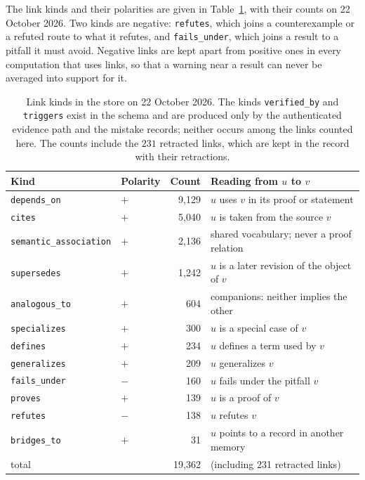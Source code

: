 The link kinds and their polarities are given in Table~\ref{tab:kinds}, with their counts on 22 October 2026. Two kinds are negative: \texttt{refutes}, which joins a counterexample or a refuted route to what it refutes, and \texttt{fails\_under}, which joins a result to a pitfall it must avoid. Negative links are kept apart from positive ones in every computation that uses links, so that a warning near a result can never be averaged into support for it.

\begin{table}[ht]
\centering\small
\begin{tabular}{llrl}
\toprule
Kind & Polarity & Count & Reading from $u$ to $v$ \\
\midrule
\texttt{depends\_on} & $+$ & 9{,}129 & $u$ uses $v$ in its proof or statement \\
\texttt{cites} & $+$ & 5{,}040 & $u$ is taken from the source $v$ \\
\texttt{semantic\_association} & $+$ & 2{,}136 & shared vocabulary; never a proof relation \\
\texttt{supersedes} & $+$ & 1{,}242 & $u$ is a later revision of the object of $v$ \\
\texttt{analogous\_to} & $+$ & 604 & companions: neither implies the other \\
\texttt{specializes} & $+$ & 300 & $u$ is a special case of $v$ \\
\texttt{defines} & $+$ & 234 & $u$ defines a term used by $v$ \\
\texttt{generalizes} & $+$ & 209 & $u$ generalizes $v$ \\
\texttt{fails\_under} & $-$ & 160 & $u$ fails under the pitfall $v$ \\
\texttt{proves} & $+$ & 139 & $u$ is a proof of $v$ \\
\texttt{refutes} & $-$ & 138 & $u$ refutes $v$ \\
\texttt{bridges\_to} & $+$ & 31 & $u$ points to a record in another memory \\
\midrule
total & & 19{,}362 & (including 231 retracted links) \\
\bottomrule
\end{tabular}
\caption{Link kinds in the store on 22 October 2026. The kinds \texttt{verified\_by} and \texttt{triggers} exist in the schema and are produced only by the authenticated evidence path and the mistake records; neither occurs among the links counted here. The counts include the $231$ retracted links, which are kept in the record with their retractions.}
\label{tab:kinds}
\end{table}


